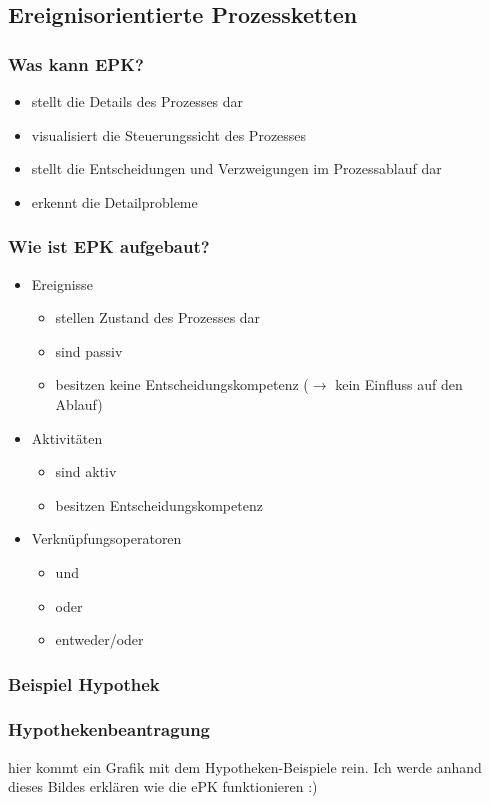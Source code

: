 \documentclass{beamer}
\begin{document}
 \subsection[Ereignisorientierte Prozessketten]{Ereignisorientierte Prozessketten}
 \begin{frame}
  \frametitle{Was kann EPK?}
  \begin{itemize}
  \item stellt die Details des Prozesses dar
  \item visualisiert die Steuerungssicht des Prozesses
  \item stellt die Entscheidungen und Verzweigungen im Prozessablauf dar
  \item erkennt die Detailprobleme
  \end{itemize}
 \end{frame}
 
  \begin{frame}
  \frametitle{Wie ist EPK aufgebaut?}
  \begin{itemize}
  \item Ereignisse 
  \begin{itemize}
  	\item stellen Zustand des Prozesses dar
  	\item sind passiv
  	\item besitzen keine Entscheidungskompetenz ($\rightarrow$ kein Einfluss auf den Ablauf)
  \end{itemize}
  \item Aktivitäten
  	\begin{itemize}
  	\item sind aktiv
  	\item besitzen Entscheidungskompetenz
  \end{itemize}
  \item Verknüpfungsoperatoren
  \begin{itemize}
  	\item und
  	\item oder
  	\item entweder/oder
  \end{itemize}
  \end{itemize}
 \end{frame}
 

 
 \subsubsection{Beispiel Hypothek}
  \begin{frame}
  \frametitle{Hypothekenbeantragung}
hier kommt ein Grafik mit dem Hypotheken-Beispiele rein. Ich werde anhand dieses Bildes erklären wie die ePK funktionieren :)
 \end{frame}
\end{document}
